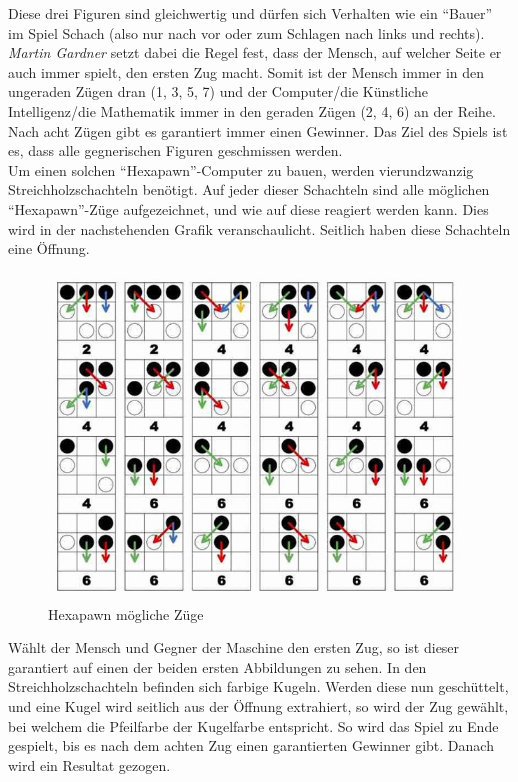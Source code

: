 Diese drei Figuren sind gleichwertig und dürfen sich Verhalten wie ein ``Bauer'' im Spiel Schach (also nur nach vor oder zum Schlagen nach links und rechts). \textit{Martin Gardner} setzt dabei die Regel fest, dass der Mensch, auf welcher Seite er auch immer spielt, den ersten Zug macht. Somit ist der Mensch immer in den ungeraden Zügen dran (1, 3, 5, 7) und der Computer/die Künstliche Intelligenz/die Mathematik immer in den geraden Zügen (2, 4, 6) an der Reihe. Nach acht Zügen gibt es garantiert immer einen Gewinner. Das Ziel des Spiels ist es, dass alle gegnerischen Figuren geschmissen werden.
\\
Um einen solchen ``Hexapawn''-Computer zu bauen, werden vierundzwanzig Streichholzschachteln benötigt. Auf jeder dieser Schachteln sind alle möglichen ``Hexapawn''-Züge aufgezeichnet, und wie auf diese reagiert werden kann. Dies wird in der nachstehenden Grafik veranschaulicht. Seitlich haben diese Schachteln eine Öffnung.


\begin{figure}[H]
  \centering
  \includegraphics[scale=0.7]{pics/hexapawn/hexapawn_zuege.jpg}
  \caption{Hexapawn mögliche Züge \cite{tech:hexapawn:cite}}
  \label{fig:tech:HexapawnZuege}
\end{figure}


Wählt der Mensch und Gegner der Maschine den ersten Zug, so ist dieser garantiert auf einen der beiden ersten Abbildungen zu sehen. In den Streichholzschachteln befinden sich farbige Kugeln. Werden diese nun geschüttelt, und eine Kugel wird seitlich aus der Öffnung extrahiert, so wird der Zug gewählt, bei welchem die Pfeilfarbe der Kugelfarbe entspricht. So wird das Spiel zu Ende gespielt, bis es nach dem achten Zug einen garantierten Gewinner gibt. Danach wird ein Resultat gezogen.


